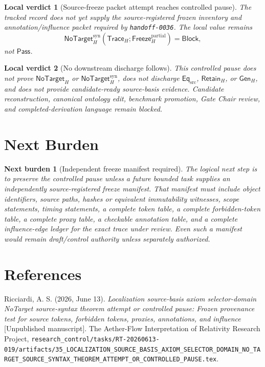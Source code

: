 \documentclass[11pt]{article}
\newcommand{\GenH}{\mathsf{Gen}_{H}}
\newcommand{\EqSrc}{\mathsf{Eq}_{\mathrm{src}}}
\newcommand{\RetainH}{\mathsf{Retain}_{H}}
\newcommand{\NoTargetH}{\mathsf{NoTarget}_{H}}
\newcommand{\NoTargetSyn}{\mathsf{NoTarget}_{H}^{\mathrm{syn}}}
\newcommand{\TraceH}{\mathsf{Trace}_{H}}
\newcommand{\FreezeH}{\mathsf{Freeze}_{H}}
\newcommand{\Pass}{\mathsf{Pass}}
\newcommand{\Block}{\mathsf{Block}}
\newtheorem{verdict}{Local verdict}
\newtheorem{nextburden}{Next burden}
\begin{document}
\begin{verdict}[Source-freeze packet attempt reaches controlled pause]
The tracked record does not yet supply the source-registered frozen
inventory and annotation/influence packet required by \texttt{handoff-0036}.
The local value remains
\[
    \NoTargetSyn(\TraceH;\FreezeH^{\mathrm{partial}})=\Block,
\]
not \(\Pass\).
\end{verdict}

\begin{verdict}[No downstream discharge follows]
This controlled pause does not prove \(\NoTargetH\) or \(\NoTargetSyn\),
does not discharge \(\EqSrc\), \(\RetainH\), or \(\GenH\), and does not
provide candidate-ready source-basis evidence. Candidate reconstruction,
canonical ontology edit, benchmark promotion, Gate Chair review, and
completed-derivation language remain blocked.
\end{verdict}

\section{Next Burden}

\begin{nextburden}[Independent freeze manifest required]
The logical next step is to preserve the controlled pause unless a future
bounded task supplies an independently source-registered freeze manifest.
That manifest must include object identifiers, source paths, hashes or
equivalent immutability witnesses, scope statements, timing statements, a
complete token table, a complete forbidden-token table, a complete proxy
table, a checkable annotation table, and a complete influence-edge ledger
for the exact trace under review. Even such a manifest would remain
draft/control authority unless separately authorized.
\end{nextburden}

\section*{References}

Ricciardi, A. S. (2026, June 13). \emph{Localization source-basis axiom
selector-domain NoTarget source-syntax theorem attempt or controlled pause:
Frozen provenance test for source tokens, forbidden tokens, proxies,
annotations, and influence} [Unpublished manuscript]. The Aether-Flow
Interpretation of Relativity Research Project,
\texttt{research\_control/tasks/RT-20260613-019/artifacts/35\_LOCALIZATION\_SOURCE\_BASIS\_AXIOM\_SELECTOR\_DOMAIN\_NO\_TARGET\_SOURCE\_SYNTAX\_THEOREM\_ATTEMPT\_OR\_CONTROLLED\_PAUSE.tex}.
\end{document}
